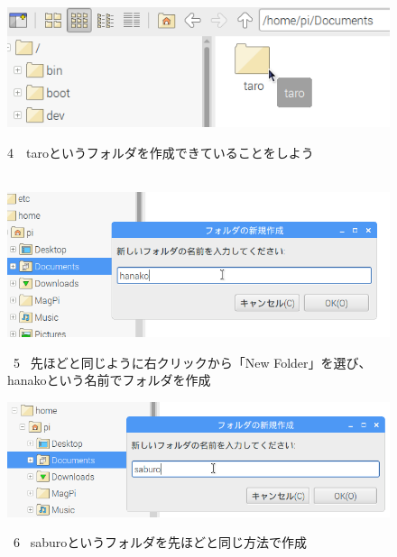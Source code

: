 \documentclass[a4paper,12pt]{jarticle}
\begin{document}
\begin{figure}[ht]
  \centering
  \includegraphics[width=12.659cm]{textbook-img040.png}
  \begin{minipage}{\textwidth}
    4　taroというフォルダを作成できていることをしよう
  \end{minipage}

\end{figure}
\clearpage
\begin{figure}
  \\
  \vspace{10mm}
  \centering
  \includegraphics[width=14.289cm]{textbook-img041.png}
  \begin{minipage}{\textwidth}
    \ 5
    \ 先ほどと同じように右クリックから「New Folder」を選び、hanakoという名前でフォルダを作成
  \end{minipage}

  \centering
  \includegraphics[width=13.884cm]{textbook-img042.png}
  \begin{minipage}{\textwidth}
    \ 6
    \ saburoというフォルダを先ほどと同じ方法で作成
  \end{minipage}


\end{figure}
\end{document}
